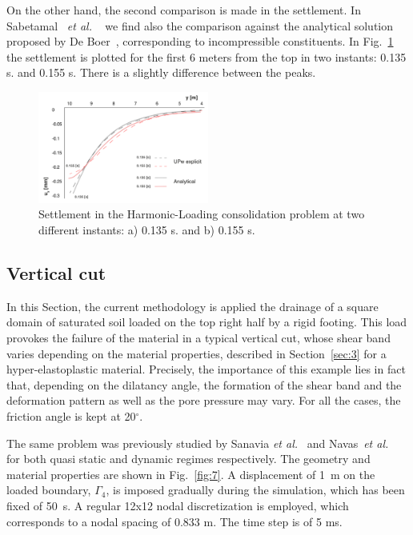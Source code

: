 \documentclass[twocolumn]{svjour3}          %
\newcommand{\etal}{
  \textit{et al.}
}
\begin{document}
On the other hand, the second comparison is made in the settlement. In Sabetamal~\etal~\cite{Sabetamal:2015} we find also the comparison against the analytical solution proposed by De Boer~\cite{deBoer:93}, corresponding to incompressible constituents. In Fig.~\ref{fig_con6} the settlement is plotted for the first 6 meters from the top in two instants: 0.135 s. and 0.155 s. There is a slightly difference between the peaks.

\begin{figure}
\begin{center}
\includegraphics[width=0.5\textwidth]{Fig/fig_disp.pdf}
\caption{Settlement in the Harmonic-Loading consolidation problem at two different instants: a) 0.135 s. and b) 0.155 s.}
\label{fig_con6}
\end{center}
\end{figure}

\subsection{Vertical cut}
\label{sec:5:2}
In this Section, the current methodology is applied the drainage of a square domain of saturated soil loaded on the top right half by a rigid footing. This load provokes the failure of the material in a typical vertical cut, whose shear band varies depending on the material properties, described in Section~\ref{sec:3} for a hyper-elastoplastic material. Precisely, the importance of this example lies in fact that, depending on the dilatancy angle, the formation of the shear band and the deformation pattern as well as the pore pressure may vary. For all the cases,  the  friction angle is kept at 20$^\circ$. 

The same problem was previously studied by Sanavia \textit{et al.}~\cite{Sanavia:01,Sanavia:02b} and Navas~\textit{et al.}~\cite{Navas:17b,Navas:17c} for both quasi static and dynamic regimes respectively. The geometry and material properties are shown in Fig.~\ref{fig:7}. A displacement of 1~m on the loaded boundary, $\Gamma_4$, is imposed  gradually during the simulation, which has been fixed of 50~s. A regular 12x12 nodal discretization is employed, which corresponds to a nodal spacing of 0.833 m. The time step is of 5 ms.
\end{document}
